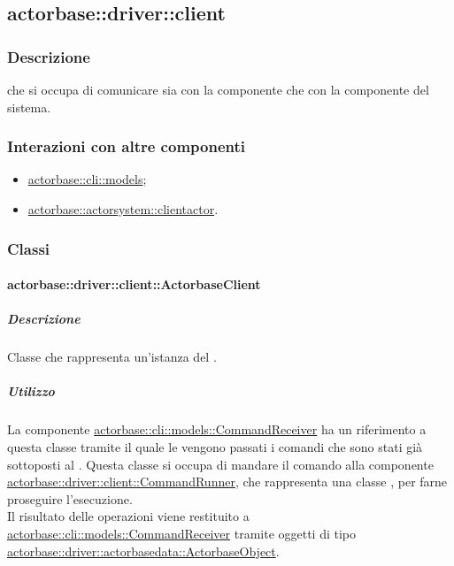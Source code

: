 \documentclass{scalatekids-article}
\begin{document}
\subsection{actorbase::driver::client}
\label{sec:actorbase::driver::client}

\subsubsection{Descrizione}

 che si occupa di comunicare sia con la componente 
che con la componente  del sistema.

\subsubsection{Interazioni con altre componenti}

\begin{itemize}
\item \hyperref[sec:actorbase::cli::models]{actorbase::cli::models};
\item \hyperref[sec:actorbase::actorsystem::clientactor]{actorbase::actorsystem::clientactor}.
\end{itemize}

\subsubsection{Classi}

\paragraph{actorbase::driver::client::ActorbaseClient}
\label{sec:actorbase::driver::client::ActorbaseClient}

\subparagraph{Descrizione}

Classe che rappresenta un'istanza del .

\subparagraph{Utilizzo}

La componente \hyperref[sec:actorbase::cli::models::CommandReceiver]{actorbase::cli::models::CommandReceiver}
ha un riferimento a questa classe tramite il quale le vengono passati
i comandi che sono stati già sottoposti al . Questa
classe si occupa di mandare il comando alla componente
\hyperref[sec:actorbase::driver::client::CommandRunner]{actorbase::driver::client::CommandRunner},
che rappresenta una classe , per farne proseguire l'esecuzione.\\
Il risultato delle operazioni viene restituito a \hyperref[sec:actorbase::cli::models::CommandReceiver]{actorbase::cli::models::CommandReceiver}
tramite oggetti di tipo \hyperref[sec:actorbase::driver::actorbasedata::ActorbaseObject]{actorbase::driver::actorbasedata::ActorbaseObject}.
\end{document}
